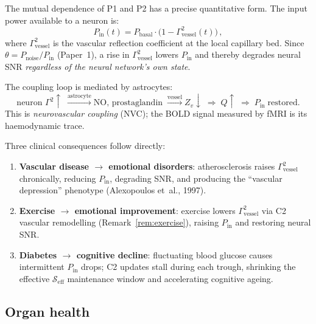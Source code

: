 \documentclass[aps,pre,twocolumn,superscriptaddress,floatfix]{revtex4-2}
\begin{document}
\begin{remark}
\label{rem:neurovascular-coupling}
The mutual dependence of P1 and P2 has a precise
quantitative form.
The input power available to a neuron is:
\begin{equation}
  P_{\text{in}}(t) = P_{\text{basal}} \cdot
  \bigl(1 - \Gamma^2_{\text{vessel}}(t)\bigr)\,,
  \label{eq:Pin-vessel}
\end{equation}
where $\Gamma^2_{\text{vessel}}$ is the vascular
reflection coefficient at the local capillary bed.
Since $\theta = P_{\text{noise}} / P_{\text{in}}$
(Paper~1), a rise in $\Gamma^2_{\text{vessel}}$
lowers $P_{\text{in}}$ and thereby degrades neural
SNR \emph{regardless of the neural network's own
state}.

The coupling loop is mediated by astrocytes:
\[
  \text{neuron } \Gamma^2 \uparrow
  \;\xrightarrow{\text{astrocyte}}
  \text{NO, prostaglandin}
  \;\xrightarrow{\text{vessel}}
  Z_v \downarrow
  \;\Rightarrow\;
  Q \uparrow
  \;\Rightarrow\;
  P_{\text{in}} \; \text{restored.}
\]
This is \emph{neurovascular coupling} (NVC);
the BOLD signal measured by fMRI is its
haemodynamic trace.

Three clinical consequences follow directly:
\begin{enumerate}
  \item \textbf{Vascular disease $\to$ emotional
    disorders}: atherosclerosis raises
    $\Gamma^2_{\text{vessel}}$ chronically,
    reducing $P_{\text{in}}$, degrading SNR,
    and producing the ``vascular depression''
    phenotype (Alexopoulos et~al., 1997).
  \item \textbf{Exercise $\to$ emotional improvement}:
    exercise lowers $\Gamma^2_{\text{vessel}}$
    via C2 vascular remodelling
    (Remark~\ref{rem:exercise}), raising
    $P_{\text{in}}$ and restoring neural SNR.
  \item \textbf{Diabetes $\to$ cognitive decline}:
    fluctuating blood glucose causes intermittent
    $P_{\text{in}}$ drops; C2 updates stall during each
    trough, shrinking the effective
    $\mathcal{S}_{\text{eff}}$ maintenance window
    and accelerating cognitive ageing.
\end{enumerate}
\end{remark}

\subsection{Organ health}
\end{document}
